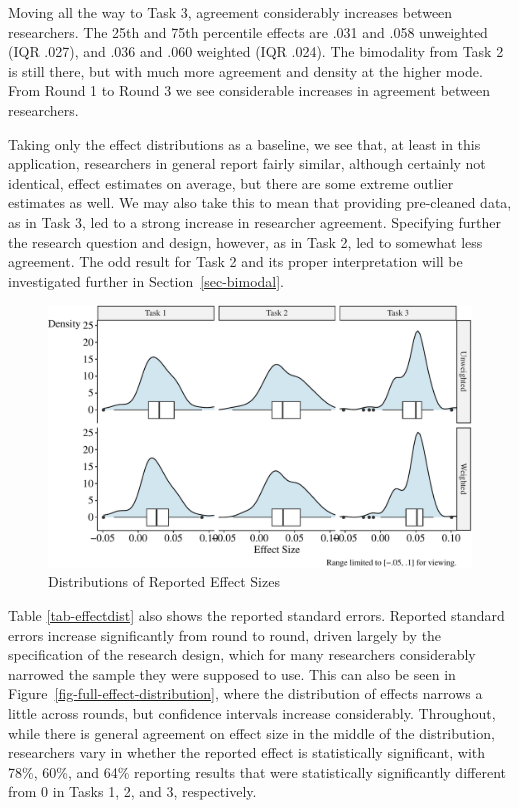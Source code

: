 \documentclass[
  letterpaper,
  DIV=11,
  numbers=noendperiod]{scrartcl}
\begin{document}
Moving all the way to Task 3, agreement considerably increases between
researchers. The 25th and 75th percentile effects are .031 and .058
unweighted (IQR .027), and .036 and .060 weighted (IQR .024). The
bimodality from Task 2 is still there, but with much more agreement and
density at the higher mode. From Round 1 to Round 3 we see considerable
increases in agreement between researchers.

Taking only the effect distributions as a baseline, we see that, at
least in this application, researchers in general report fairly similar,
although certainly not identical, effect estimates on average, but there
are some extreme outlier estimates as well. We may also take this to
mean that providing pre-cleaned data, as in Task 3, led to a strong
increase in researcher agreement. Specifying further the research
question and design, however, as in Task 2, led to somewhat less
agreement. The odd result for Task 2 and its proper interpretation will
be investigated further in Section~\ref{sec-bimodal}.

\begin{figure}

{\centering \includegraphics{The-Sources-of-Researcher-Variation-in-Economics_files/figure-pdf/fig-effect-distributions-1.pdf}

}

\caption{\label{fig-effect-distributions}Distributions of Reported
Effect Sizes}

\end{figure}

Table \ref{tab-effectdist} also shows the reported standard errors.
Reported standard errors increase significantly from round to round,
driven largely by the specification of the research design, which for
many researchers considerably narrowed the sample they were supposed to
use. This can also be seen in Figure~\ref{fig-full-effect-distribution},
where the distribution of effects narrows a little across rounds, but
confidence intervals increase considerably. Throughout, while there is
general agreement on effect size in the middle of the distribution,
researchers vary in whether the reported effect is statistically
significant, with 78\%, 60\%, and 64\% reporting results that were
statistically significantly different from 0 in Tasks 1, 2, and 3,
respectively.
\end{document}
